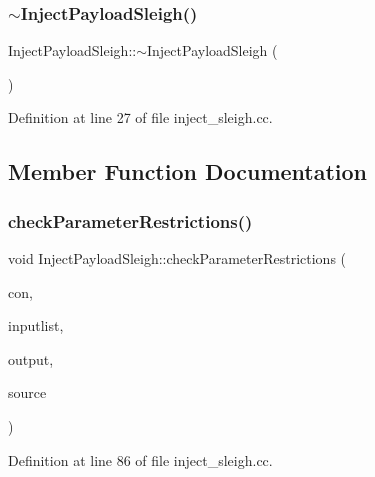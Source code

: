 \subsubsection{\texorpdfstring{$\sim$InjectPayloadSleigh()}{~InjectPayloadSleigh()}}
{\footnotesize\ttfamily Inject\+Payload\+Sleigh\+::$\sim$\+Inject\+Payload\+Sleigh (\begin{DoxyParamCaption}\item[{void}]{ }\end{DoxyParamCaption})\hspace{0.3cm}{\ttfamily [virtual]}}



Definition at line 27 of file inject\+\_\+sleigh.\+cc.



\subsection{Member Function Documentation}
\mbox{\label{class_inject_payload_sleigh_af694891d58e93134de26968640817371}} 
\subsubsection{\texorpdfstring{checkParameterRestrictions()}{checkParameterRestrictions()}}
{\footnotesize\ttfamily void Inject\+Payload\+Sleigh\+::check\+Parameter\+Restrictions (\begin{DoxyParamCaption}\item[{\mbox{\hyperlink{class_inject_context_sleigh}{Inject\+Context\+Sleigh}} \&}]{con,  }\item[{const vector$<$ \mbox{\hyperlink{class_inject_parameter}{Inject\+Parameter}} $>$ \&}]{inputlist,  }\item[{const vector$<$ \mbox{\hyperlink{class_inject_parameter}{Inject\+Parameter}} $>$ \&}]{output,  }\item[{const string \&}]{source }\end{DoxyParamCaption})\hspace{0.3cm}{\ttfamily [static]}}



Definition at line 86 of file inject\+\_\+sleigh.\+cc.

